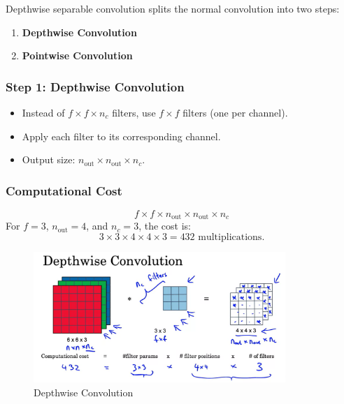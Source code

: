 \documentclass[letterpaper,12pt,notitlepage,twoside]{report}
\begin{document}
Depthwise separable convolution splits the normal convolution into two steps:
\begin{enumerate}[nosep]
    \item \textbf{Depthwise Convolution}
    \item \textbf{Pointwise Convolution}
\end{enumerate}

\subsubsection*{Step 1: Depthwise Convolution}
\begin{itemize}[nosep]
    \item Instead of $f \times f \times n_c$ filters, use $f \times f$ filters (one per channel).
    \item Apply each filter to its corresponding channel.
    \item Output size: $n_{\text{out}} \times n_{\text{out}} \times n_c$.
\end{itemize}

\subsubsection*{Computational Cost}
\[
f \times f \times n_{\text{out}} \times n_{\text{out}} \times n_c
\]
For $f = 3$, $n_{\text{out}} = 4$, and $n_c = 3$, the cost is:
\[
3 \times 3 \times 4 \times 4 \times 3 = 432 \text{ multiplications.}
\]

\begin{figure}[h]
	\centering
	\includegraphics[width=0.85\textwidth]{Images/Depthwise Convolution.png}
	\caption{Depthwise Convolution}
	\label{fig:40}
\end{figure}
\FloatBarrier
\end{document}
